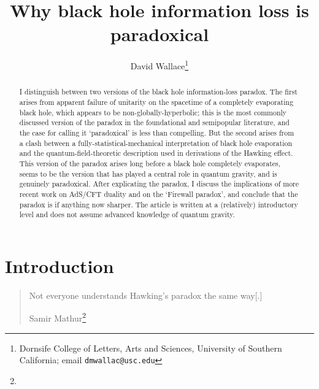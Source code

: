 \documentclass{article}
\begin{document}
\title{Why black hole information loss is paradoxical}\author{David Wallace\thanks{Dornsife College of Letters, Arts and Sciences, University of Southern California; email \texttt{dmwallac@usc.edu}}}

\maketitle


\begin{abstract}
I distinguish between two versions of the black hole information-loss paradox. The first arises from apparent failure of unitarity on the spacetime of a completely evaporating black hole, which appears to be non-globally-hyperbolic; this is the most commonly discussed version of the paradox in the foundational and semipopular literature, and the case for calling it `paradoxical' is less than compelling. But the second arises from a clash between a fully-statistical-mechanical interpretation of black hole evaporation and the quantum-field-theoretic description used in derivations of the Hawking effect. This version of the paradox arises long before a black hole completely evaporates, seems to be the version that has played a central role in quantum gravity, and is genuinely paradoxical. After explicating the paradox, I discuss the implications of more recent work on AdS/CFT duality and on the `Firewall paradox', and conclude that the paradox is if anything now sharper. The article is written at a (relatively) introductory level and does not assume advanced knowledge of quantum gravity.
\end{abstract}

\section{Introduction}

\begin{quote}
Not everyone understands Hawking's paradox the same way[.]

\begin{flushright}
Samir Mathur\footnote{}
\end{flushright}
\end{quote}
\end{document}
